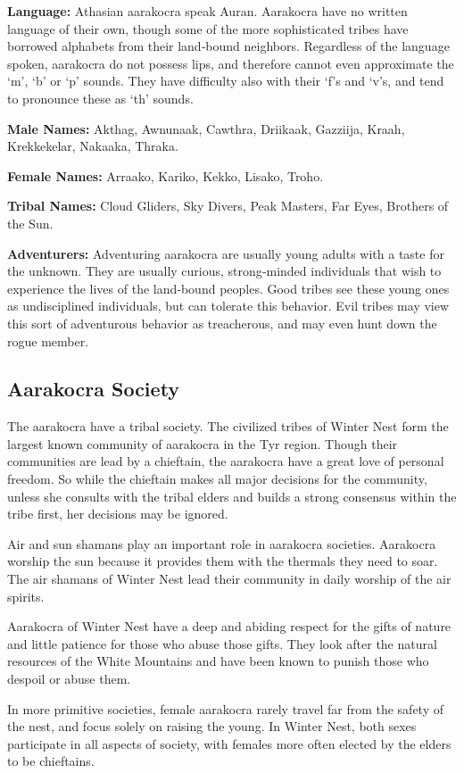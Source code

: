 \textbf{Language:} Athasian aarakocra speak Auran. Aarakocra have no written language of their own, though some of the more sophisticated tribes have borrowed alphabets from their land‐bound neighbors. Regardless of the language spoken, aarakocra do not possess lips, and therefore cannot even approximate the ‘m', ‘b' or ‘p' sounds. They have difficulty also with their ‘f's and ‘v's, and tend to pronounce these as ‘th' sounds.

\textbf{Male Names:} Akthag, Awnunaak, Cawthra, Driikaak, Gazziija, Kraah, Krekkekelar, Nakaaka, Thraka.

\textbf{Female Names:} Arraako, Kariko, Kekko, Lisako, Troho.

\textbf{Tribal Names:} Cloud Gliders, Sky Divers, Peak Masters, Far Eyes, Brothers of the Sun.

\textbf{Adventurers:} Adventuring aarakocra are usually young adults with a taste for the unknown. They are usually curious, strong‐minded individuals that wish to experience the lives of the land‐bound peoples. Good tribes see these young ones as undisciplined individuals, but can tolerate this behavior. Evil tribes may view this sort of adventurous behavior as treacherous, and may even hunt down the rogue member.

\subsection{Aarakocra Society}
The aarakocra have a tribal society. The civilized tribes of Winter Nest form the largest known community of aarakocra in the Tyr region. Though their communities are lead by a chieftain, the aarakocra have a great love of personal freedom. So while the chieftain makes all major decisions for the community, unless she consults with the tribal elders and builds a strong consensus within the tribe first, her decisions may be ignored.

Air and sun shamans play an important role in aarakocra societies. Aarakocra worship the sun because it provides them with the thermals they need to soar. The air shamans of Winter Nest lead their community in daily worship of the air spirits.

Aarakocra of Winter Nest have a deep and abiding respect for the gifts of nature and little patience for those who abuse those gifts. They look after the natural resources of the White Mountains and have been known to punish those who despoil or abuse them.

In more primitive societies, female aarakocra rarely travel far from the safety of the nest, and focus solely on raising the young. In Winter Nest, both sexes participate in all aspects of society, with females more often elected by the elders to be chieftains.

